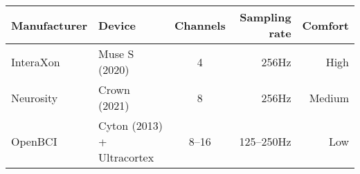 \begin{tabular}{llcrr}
    \toprule
    Manufacturer
    & Device
    & Channels
    & Sampling rate
    & Comfort
    \\
    \midrule
    InteraXon
    & Muse S (2020)
    & 4
    & 256Hz
    & High
    \\
    Neurosity
    & Crown (2021)
    & 8
    & 256Hz
    & Medium
    \\
    OpenBCI
    & Cyton (2013) + Ultracortex
    & 8--16
    & 125--250Hz
    & Low
    \\
    \bottomrule
\end{tabular}
